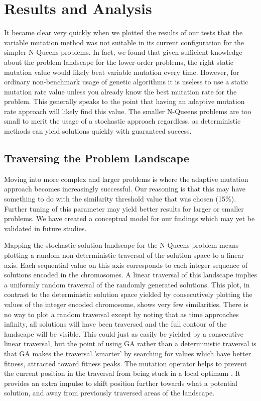 \documentclass{sig-alternate}
\begin{document}
% 
%
\section{Results and Analysis}
It became clear very quickly when we plotted the results of our tests that the variable mutation method was not suitable in its current configuration for the simpler N-Queens problems. In fact, we found that given sufficient knowledge about the problem landscape for the lower-order problems, the right static mutation value would likely beat variable mutation every time. However, for ordinary non-benchmark usage of genetic algorithms it is useless to use a static mutation rate value unless you already know the best mutation rate for the problem. This generally speaks to the point that having an adaptive mutation rate approach will likely find this value. The smaller N-Queens problems are too small to merit the usage of a stochastic approach regardless, as deterministic methods can yield solutions quickly with guaranteed success.

\subsection{Traversing the Problem Landscape}
Moving into more complex and larger problems is where the adaptive mutation approach becomes increasingly successful. Our reasoning is that this may have something to do with the similarity threshold value that was chosen (15\%). Further tuning of this parameter may yield better results for larger or smaller problems. We have created a conceptual model for our findings which may yet be validated in future studies.

Mapping the stochastic solution landscape for the N-Queens problem means plotting a random non-deterministic traversal of the solution space to a linear axis. Each sequential value on this axis corresponds to each integer sequence of solutions encoded in the chromosomes. A linear traversal of this landscape implies a uniformly random traversal of the randomly generated solutions. This plot, in contrast to the deterministic solution space yielded by consecutively plotting the values of the integer encoded chromosome, shows very few similarities. There is no way to plot a random traversal except by noting that as time approaches infinity, all solutions will have been traversed and the full contour of the landscape will be visible. This could just as easily be yielded by a consecutive linear traversal, but the point of using GA rather than a deterministic traversal is that GA makes the traversal 'smarter' by searching for values which have better fitness, attracted toward fitness peaks\cite{srinivas1994genetic}. The mutation operator helps to prevent the current position in the traversal from being stuck in a local optimum \cite{ye2010some}. It provides an extra impulse to shift position further towards what a potential solution, and away from previously traversed areas of the landscape.
\end{document}
